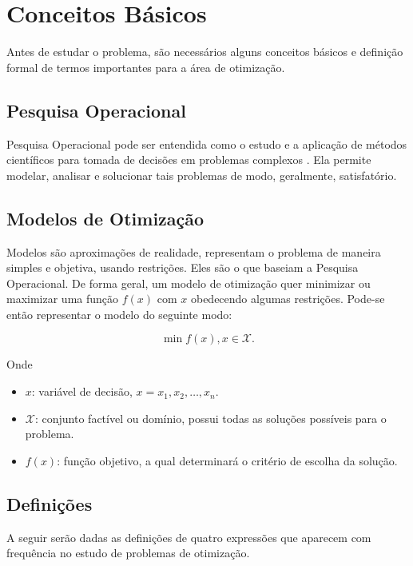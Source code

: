 \chapter{Conceitos Básicos}\label{ch:conceitos-basicos}

Antes de estudar o problema, são necessários alguns conceitos básicos e definição formal de termos importantes para a área de otimização.


\section{Pesquisa Operacional}\label{sec:pesquisa-operacional}

Pesquisa Operacional pode ser entendida como o estudo e a aplicação de métodos científicos para tomada de decisões em problemas complexos \cite[p.IX]{arenales}.
Ela permite modelar, analisar e solucionar tais problemas de modo, geralmente, satisfatório.


\section{Modelos de Otimização}\label{sec:modelos-de-otimizacao}

Modelos são aproximações de realidade, representam o problema de maneira simples e objetiva, usando restrições.
Eles são o que baseiam a Pesquisa Operacional.
De forma geral, um modelo de otimização quer minimizar ou maximizar uma função $f(x)$ com $x$ obedecendo algumas restrições.
Pode-se então representar o modelo do seguinte modo:

\[
    \min f(x), x \in \mathcal{X}.
\]

Onde

\begin{itemize}
    \item $x$: variável de decisão, $x = x_1, x_2, \dots, x_n$.
    \item $\mathcal{X}$: conjunto factível ou domínio, possui todas as soluções possíveis para o problema.
    \item $f(x)$: função objetivo, a qual determinará o critério de escolha da solução.
\end{itemize}


\section{Definições}\label{sec:definicoes}

A seguir serão dadas as definições de quatro expressões que aparecem com frequência no estudo de problemas de otimização.

